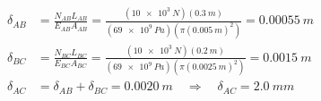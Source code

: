 \documentclass[11pt]{article}
\begin{document}
\bigskip
\begin{align*}
  \delta_{AB} &= \frac{N_{AB}L_{AB}}{E_{AB}A_{AB}}
     = \frac{(\SI{10e3}{N})(\SI{0.3}{m})}{(\SI{69e9}{Pa})\left(\pi(\SI{0.005}{m})^2\right)}
     = \SI{0.00055}{m} \\[4pt]
  \delta_{BC} &= \frac{N_{BC}L_{BC}}{E_{BC}A_{BC}}
     = \frac{(\SI{10e3}{N})(\SI{0.2}{m})}{(\SI{69e9}{Pa})\left(\pi(\SI{0.0025}{m})^2\right)}
     = \SI{0.0015}{m} \\[4pt]
  \delta_{AC} &= \delta_{AB} + \delta_{BC} = \SI{0.0020}{m}
     \quad\Rightarrow\quad \boxed{\delta_{AC} = \SI{2.0}{mm}}
\end{align*}
\end{document}
